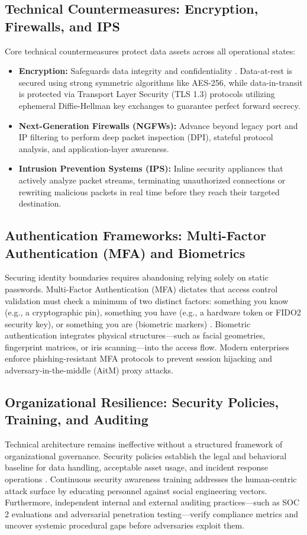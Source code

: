 \documentclass[11pt,a4paper]{article}
\begin{document}
\subsection{Technical Countermeasures: Encryption, Firewalls, and IPS}
Core technical countermeasures protect data assets across all operational states:
\begin{itemize}
    \item \textbf{Encryption:} Safeguards data integrity and confidentiality \cite{b5}. Data-at-rest is secured using strong symmetric algorithms like AES-256, while data-in-transit is protected via Transport Layer Security (TLS 1.3) protocols utilizing ephemeral Diffie-Hellman key exchanges to guarantee perfect forward secrecy.
    \item \textbf{Next-Generation Firewalls (NGFWs):} Advance beyond legacy port and IP filtering to perform deep packet inspection (DPI), stateful protocol analysis, and application-layer awareness.
    \item \textbf{Intrusion Prevention Systems (IPS):} Inline security appliances that actively analyze packet streams, terminating unauthorized connections or rewriting malicious packets in real time before they reach their targeted destination.
\end{itemize}

\subsection{Authentication Frameworks: Multi-Factor Authentication (MFA) and Biometrics}
Securing identity boundaries requires abandoning relying solely on static passwords. Multi-Factor Authentication (MFA) dictates that access control validation must check a minimum of two distinct factors: something you know (e.g., a cryptographic pin), something you have (e.g., a hardware token or FIDO2 security key), or something you are (biometric markers) \cite{b2, b10}. Biometric authentication integrates physical structures—such as facial geometries, fingerprint matrices, or iris scanning—into the access flow. Modern enterprises enforce phishing-resistant MFA protocols to prevent session hijacking and adversary-in-the-middle (AitM) proxy attacks.

\subsection{Organizational Resilience: Security Policies, Training, and Auditing}
Technical architecture remains ineffective without a structured framework of organizational governance. Security policies establish the legal and behavioral baseline for data handling, acceptable asset usage, and incident response operations \cite{b1}. Continuous security awareness training addresses the human-centric attack surface by educating personnel against social engineering vectors. Furthermore, independent internal and external auditing practices—such as SOC 2 evaluations and adversarial penetration testing—verify compliance metrics and uncover systemic procedural gaps before adversaries exploit them.
\end{document}
